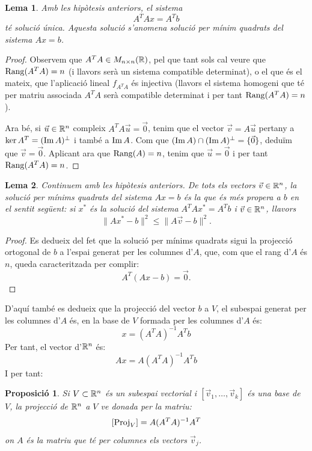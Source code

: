\documentclass[
  11pt,
]{book}
\numberwithin{dummy}{section}
\theoremstyle{maincolornumbox}
\theoremstyle{blacknumex}
\theoremstyle{blacknumbox}
\theoremstyle{maincolornum}
\newtheorem{propositionT}{Proposició}[chapter]
\newtheorem{lemmaT}{Lema}[chapter]
\newenvironment{proposition}{\begin{pBox}\begin{propositionT}}{\end{propositionT}\end{pBox}}
\newenvironment{lemma}{\begin{pBox}\begin{lemmaT}}{\end{lemmaT}\end{pBox}}
\newlength\esp
\begin{document}
\begin{lemma}
Amb les hipòtesis anteriors, el sistema \[A^T A x = A^T b\] té solució
única. Aquesta solució s'anomena \emph{solució per mínim quadrats del sistema
\(Ax=b\)}.
\end{lemma}

\begin{proof}
Observem que \(A^TA \in M_{n\times n}(\mathbb{R})\), pel que tant sols
cal veure que \(\operatorname{Rang}(A^T A)=n\) (i llavors serà un sistema compatible
determinat), o el que és el mateix, que l'aplicació lineal \(f_{A^TA}\) és
injectiva (llavors el sistema homogeni que té per matriu associada
\(A^TA\) serà compatible determinat i per tant \(\operatorname{Rang}(A^T A)=n\)).

Ara bé, si \(\vec u \in \mathbb{R}^n\) compleix \(A^TA\vec u = \vec 0\), tenim que
el vector \(\vec v=A\vec u\) pertany a \(\ker A^T=(\operatorname{Im} A)^\perp\) i també a
\(\operatorname{Im} A\). Com que \((\operatorname{Im} A)\cap (\operatorname{Im} A)^\perp=\{\vec 0\}\), deduïm que
\(\vec v = \vec 0\). Aplicant ara que \(\operatorname{Rang}(A)=n\), tenim que
\(\vec u=\vec 0\) i per tant \(\operatorname{Rang}(A^TA)=n\).
\end{proof}

\begin{lemma}
Continuem amb les hipòtesis anteriors. De tots els vectors
\(\vec v \in \mathbb{R}^n\), la solució per mínims quadrats del sistema \(Ax=b\) és
la que és més propera a \(b\) en el sentit següent: si \(x^*\) és la solució
del sistema \(A^TAx^*=A^Tb\) i \(\vec v\in \mathbb{R}^n\), llavors
\[\|Ax^* - b\|^2 \leq \|A\vec v- b\|^2.\]
\end{lemma}

\begin{proof}
Es dedueix del fet que la solució per mínims quadrats sigui la
projecció ortogonal de \(b\) a l'espai generat per les columnes d'\(A\),
que, com que el rang d'\(A\) és \(n\), queda caracteritzada per complir:
\[A^T(Ax-b)=\vec 0 .\]
\end{proof}

D'aquí també es dedueix que la projecció del vector \(b\) a \(V\), el
subespai generat per les columnes d'\(A\) és, en la base de \(V\) formada
per les columnes d'\(A\) és: \[x=(A^TA)^{-1}A^Tb\] Per tant, el vector
d'\(\mathbb{R}^n\) és: \[Ax=A(A^TA)^{-1}A^Tb\] I per tant:

\begin{proposition}
Si \(V\subset \mathbb{R}^n\) és un subespai vectorial i
\([\vec v_1, \dots , \vec v_k]\) és una base de \(V\), la projecció de
\(\mathbb{R}^n\) a \(V\) ve donada per la matriu: \[[\operatorname{Proj}_V]=A(A^TA)^{-1}A^T\] on
\(A\) és la matriu que té per columnes els vectors \(\vec v_j\).
\end{proposition}
\end{document}
